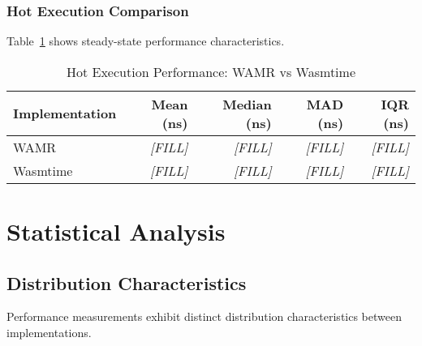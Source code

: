 \subsubsection{Hot Execution Comparison}
\label{subsubsec:hot-execution}

Table~\ref{tab:hot-performance} shows steady-state performance characteristics.

\begin{table}[htbp]
\centering
\caption{Hot Execution Performance: WAMR vs Wasmtime}
\label{tab:hot-performance}
\begin{tabular}{lrrrr}
\toprule
\textbf{Implementation} & \textbf{Mean (ns)} & \textbf{Median (ns)} & \textbf{MAD (ns)} & \textbf{IQR (ns)} \\
\midrule
WAMR          & \textit{[FILL]} & \textit{[FILL]} & \textit{[FILL]} & \textit{[FILL]} \\
Wasmtime      & \textit{[FILL]} & \textit{[FILL]} & \textit{[FILL]} & \textit{[FILL]} \\
\bottomrule
\end{tabular}
\end{table}


\section{Statistical Analysis}
\label{sec:statistical-analysis}

\subsection{Distribution Characteristics}
\label{subsec:distribution-analysis}

Performance measurements exhibit distinct distribution characteristics between implementations. 


